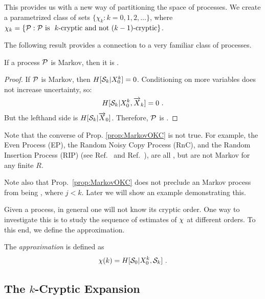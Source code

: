 This provides us with a new way of partitioning the space of processes. We
create a parametrized class of sets $\{\chi_k: k = 0,1,2, \ldots\}$, where
$\chi_k = \{\Process: \Process ~\mathrm{is}~
\text{ \cryptic{k} and not \cryptic{(k-1)}}\}$.

The following result provides a connection to a very familiar class of
processes.

\begin{Prop}
If a process $\mathcal{P}$ is  Markov, then it is .
\label{prop:MarkovOKC}
\end{Prop}

\begin{proof}
If $\mathcal{P}$ is  Markov, then $H[\mathcal{S}_k | {X}_0^k]=0$.
Conditioning on more variables does not increase uncertainty, so:
\begin{equation*}
H[\mathcal{S}_k | {X}_0^k, \smash{\overrightarrow{{X}}}_k] = 0 ~.
\end{equation*}
But the lefthand side is $H[\mathcal{S}_k | \smash{\overrightarrow{{X}}}_0]$. Therefore,
$\mathcal{P}$ is .
\end{proof}

Note that the converse of Prop. \ref{prop:MarkovOKC} is not true. For example,
the Even Process (EP), the Random Noisy Copy Process (RnC), and the Random
Insertion Process (RIP) (see Ref.~\cite{Crut08a} and Ref.~\cite{Crut08b}), are all
, but are not  Markov for any finite $R$.

Note also that Prop.~\ref{prop:MarkovOKC} does not preclude an 
Markov process from being , where $j < k$.
Later we will show an example demonstrating this.

Given a process, in general one will not know its cryptic order. One way to
investigate this is to study the sequence of estimates of $\chi$ at different
orders. To this end, we define the  approximation.

\begin{Def}
The \emph{ approximation} is defined as
\begin{align*}
\chi(k) = H[\mathcal{S}_0 | {X}_0^k, \mathcal{S}_k] ~.
\end{align*}
\end{Def}

\subsection{The $k$-Cryptic Expansion}

